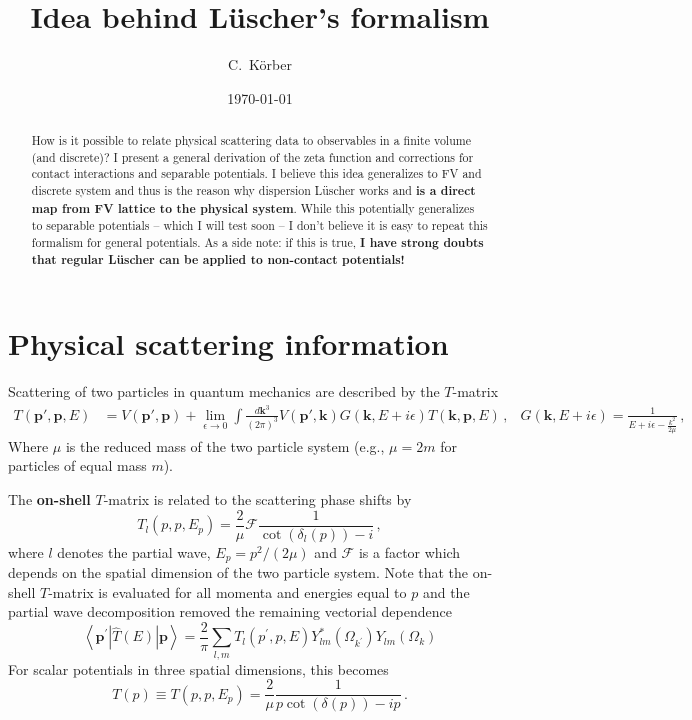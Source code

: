 \documentclass[
    aps,
    prl,
    showkeys,
    nofootinbib,
    floatfix
]{revtex4}
\renewcommand{\vec}[1]{\boldsymbol{#1}}
\begin{document}
\title{Idea behind Lüscher's formalism}

\author{C.~Körber}

\date{\today}

\begin{abstract}%
	How is it possible to relate physical scattering data to observables in a finite volume (and discrete)?
	I present a general derivation of the zeta function and corrections for contact interactions and separable potentials.
	I believe this idea generalizes to FV and discrete system and thus is the reason why dispersion Lüscher works and \textbf{is a direct map from FV lattice to the physical system}.
	While this potentially generalizes to separable potentials -- which I will test soon -- I don't believe it is easy to repeat this formalism for general potentials.
	As a side note: if this is true, \textbf{I have strong doubts that regular Lüscher can be applied to non-contact potentials!}
\end{abstract}

\maketitle

\section{Physical scattering information}

Scattering of two particles in quantum mechanics are described by the $T$-matrix 
\begin{align}
	T(\vec p', \vec p, E)
	&=
	V(\vec p', \vec p) + \lim\limits_{\epsilon \to 0}\int \frac{d \vec k^3}{(2\pi)^3} V(\vec p', \vec k) G(\vec k, E + i \epsilon) T(\vec k, \vec p, E) \, ,
	&
	G(\vec k, E+ i \epsilon) = \frac{1}{E + i \epsilon - \frac{k^2}{2\mu}}
	\, ,
\end{align}
Where $\mu$ is the reduced mass of the two particle system (e.g., $\mu = 2 m$ for particles of equal mass $m$).

The \textbf{on-shell} $T$-matrix is related to the scattering phase shifts by
\begin{equation}
	T_l(p, p , E_p) = \frac{2}{\mu} \mathcal F \frac{1}{\cot (\delta_l(p)) - i} \, ,
\end{equation}
where $l$ denotes the partial wave, $E_p = p^2 / (2 \mu)$ and $\mathcal F$ is a factor which depends on the spatial dimension of the two particle system.
Note that the on-shell $T$-matrix is evaluated for all momenta and energies equal to $p$ and the partial wave decomposition removed the remaining vectorial dependence
\begin{equation}
	\left\langle \vec{p}^{\prime}| \hat T(E) | \vec{p}\right\rangle=\frac{2}{\pi} \sum_{l, m} T_{l}\left(p^{\prime}, p, E\right) Y_{l m}^{*}\left(\Omega_{k^{\prime}}\right) Y_{l m}\left(\Omega_{k}\right)
\end{equation}
For scalar potentials in three spatial dimensions, this becomes
\begin{equation}\label{eq-phase-shifts}
	T(p) \equiv T(p, p, E_p) = \frac{2}{\mu} \frac{1}{p\cot (\delta(p)) - ip} \, .
\end{equation}
\end{document}

